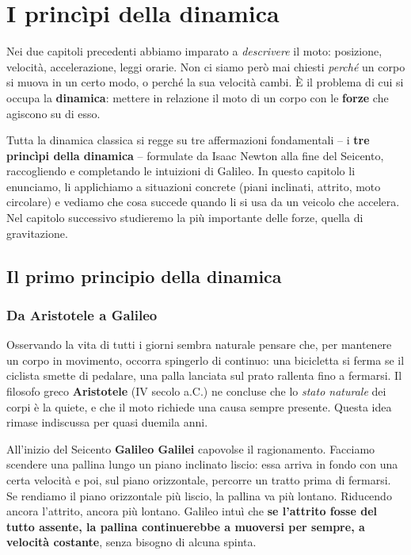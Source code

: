 \chapter{I princìpi della dinamica}

Nei due capitoli precedenti abbiamo imparato a \emph{descrivere} il moto: posizione, velocità, accelerazione, leggi orarie. Non ci siamo però mai chiesti \emph{perché} un corpo si muova in un certo modo, o perché la sua velocità cambi. È il problema di cui si occupa la \textbf{dinamica}: mettere in relazione il moto di un corpo con le \textbf{forze} che agiscono su di esso.

Tutta la dinamica classica si regge su tre affermazioni fondamentali -- i \textbf{tre princìpi della dinamica} -- formulate da Isaac Newton alla fine del Seicento, raccogliendo e completando le intuizioni di Galileo. In questo capitolo li enunciamo, li applichiamo a situazioni concrete (piani inclinati, attrito, moto circolare) e vediamo che cosa succede quando li si usa da un veicolo che accelera. Nel capitolo successivo studieremo la più importante delle forze, quella di gravitazione.

\section{Il primo principio della dinamica}

\subsection{Da Aristotele a Galileo}
Osservando la vita di tutti i giorni sembra naturale pensare che, per mantenere un corpo in movimento, occorra spingerlo di continuo: una bicicletta si ferma se il ciclista smette di pedalare, una palla lanciata sul prato rallenta fino a fermarsi. Il filosofo greco \textbf{Aristotele} (IV secolo a.C.) ne concluse che lo \emph{stato naturale} dei corpi è la quiete, e che il moto richiede una causa sempre presente. Questa idea rimase indiscussa per quasi duemila anni.

All'inizio del Seicento \textbf{Galileo Galilei} capovolse il ragionamento. Facciamo scendere una pallina lungo un piano inclinato liscio: essa arriva in fondo con una certa velocità e poi, sul piano orizzontale, percorre un tratto prima di fermarsi. Se rendiamo il piano orizzontale più liscio, la pallina va più lontano. Riducendo ancora l'attrito, ancora più lontano. Galileo intuì che \textbf{se l'attrito fosse del tutto assente, la pallina continuerebbe a muoversi per sempre, a velocità costante}, senza bisogno di alcuna spinta.

